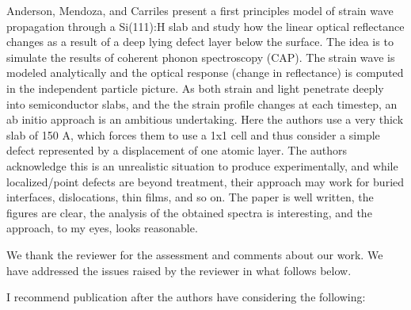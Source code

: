\documentclass[aps,prb,10pt,endfloats]{revtex4-1}
\begin{document}
Anderson, Mendoza, and Carriles present a first principles model of strain wave
propagation through a Si(111):H slab and study how the linear optical
reflectance changes as a result of a deep lying defect layer below the surface.
The idea is to simulate the results of coherent phonon spectroscopy (CAP). The
strain wave is modeled analytically and the optical response (change in
reflectance) is computed in the independent particle picture. As both strain and
light penetrate deeply into semiconductor slabs, and the the strain profile
changes at each timestep, an ab initio approach is an ambitious undertaking.
Here the authors use a very thick slab of 150 A, which forces them to use a 1x1
cell and thus consider a simple defect represented by a displacement of one
atomic layer. The authors acknowledge this is an unrealistic situation to
produce experimentally, and while localized/point defects are beyond treatment,
their approach may work for buried interfaces, dislocations, thin films, and so
on. The paper is well written, the figures are clear, the analysis of the
obtained spectra is interesting, and the approach, to my eyes, looks reasonable.
\begin{shaded*}
We thank the reviewer for the assessment and comments about our work. We have
addressed the issues raised by the reviewer in what follows below.
\end{shaded*}

I recommend publication after the authors have considering the following:
\end{document}

